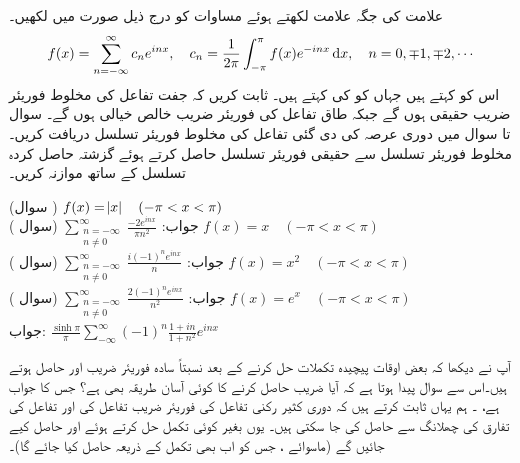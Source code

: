 علامت  کی جگہ علامت  لکھتے  ہوئے مساوات  کو درج ذیل صورت میں لکھیں۔
\begin{align}\label{مساوات_فوریئر_مخلوط_ب}
f(x)=\sum_{n=-\infty}^{\infty} c_ne^{inx},\quad c_n=\frac{1}{2\pi}\int_{-\pi}^{\pi} f(x)e^{-inx}\dif x,\quad n=0,\mp 1,\mp 2,\cdots
\end{align}
اس کو  کہتے ہیں جہاں   کو  کی  کہتے ہیں۔
ثابت کریں کہ جفت تفاعل کی مخلوط فوریئر  ضریب  حقیقی ہوں گے جبکہ طاق تفاعل کی فوریئر  ضریب  خالص خیالی ہوں گے۔
سوال  تا سوال  میں دوری عرصہ  کی دی گئی تفاعل  کی مخلوط فوریئر تسلسل دریافت کریں۔مخلوط فوریئر تسلسل سے حقیقی فوریئر تسلسل حاصل کرتے ہوئے  گزشتہ حاصل کردہ تسلسل کے ساتھ موازنہ کریں۔

\quad (سوال )
$f(x)=\abs{x}\quad (-\pi<x<\pi)$\\
جواب:\quad
$\sum\limits_{\substack{ n=-\infty\\ n\ne 0}}^{\infty} {\frac{-2 e^{inx}}{\pi n^2}}$
\quad (سوال )
$f(x)=x\quad (-\pi<x<\pi)$\\
جواب:\quad
$\sum\limits_{\substack{ n=-\infty\\ n\ne 0}}^{\infty} {\frac{i (-1)^n e^{inx}}{n}}$
\quad (سوال )
$f(x)=x^2\quad (-\pi<x<\pi)$\\
جواب:\quad
$\sum\limits_{\substack{ n=-\infty\\ n\ne 0}}^{\infty} {\frac{2(-1)^n e^{inx}}{n^2}}$
\quad (سوال )
$f(x)=e^x\quad (-\pi<x<\pi)$\\
جواب:\quad
$\frac{\sinh \pi}{\pi}\sum\limits_{-\infty}^{\infty} (-1)^n \frac{1+i n}{1+n^2}e^{inx}$

آپ نے دیکھا کہ  بعض اوقات پیچیدہ تکملات حل کرنے کے بعد نسبتاً سادہ فوریئر  ضریب   اور  حاصل ہوتے ہیں۔اس سے سوال پیدا ہوتا ہے کہ آیا  ضریب  حاصل کرنے کا کوئی آسان طریقہ بھی ہے؟ جس کا جواب ہے، ۔ ہم یہاں ثابت کرتے ہیں کہ دوری کثیر رکنی تفاعل کی فوریئر  ضریب  تفاعل کی اور تفاعل کی تفارق کی چھلانگ سے حاصل کی جا سکتی ہیں۔ یوں بغیر کوئی تکمل حل کرتے ہوئے  اور  حاصل کیے جائیں گے (ماسوائے ، جس کو اب بھی تکمل کے ذریعہ حاصل کیا جائے گا)۔

